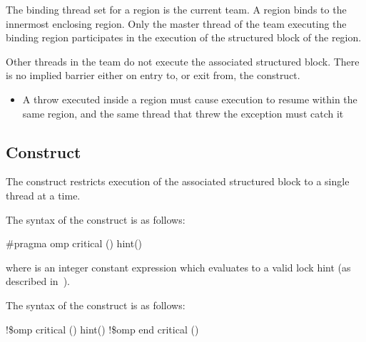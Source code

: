 \binding
The binding thread set for a  region is the current team. A  region 
binds to the innermost enclosing  region. Only the master thread of the team 
executing the binding  region participates in the execution of the structured 
block of the  region.

\descr
Other threads in the team do not execute the associated structured block. There is no 
implied barrier either on entry to, or exit from, the  construct.

\restrictions
\cppspecificstart
\begin{itemize}
\item A throw executed inside a  region must cause execution to resume within the 
same  region, and the same thread that threw the exception must catch it
\end{itemize}
\cppspecificend











\subsection{ Construct}
\label{subsec:critical Construct}
\summary
The  construct restricts execution of the associated structured block to a 
single thread at a time.

\syntax
\ccppspecificstart
The syntax of the  construct is as follows:

\begin{boxedcode}
\#pragma omp critical \plc{[}() \plc{[}hint()\plc{] ] new-line}
\end{boxedcode}

where  is an integer constant expression which
evaluates to a valid lock hint (as described 
in~).

\fortranspecificstart
The syntax of the  construct is as follows:

\begin{boxedcode}
!\$omp critical \plc{[}() \plc{[}hint()\plc{] ] new-line}
!\$omp end critical \plc{[}()\plc{]}  
\end{boxedcode}

